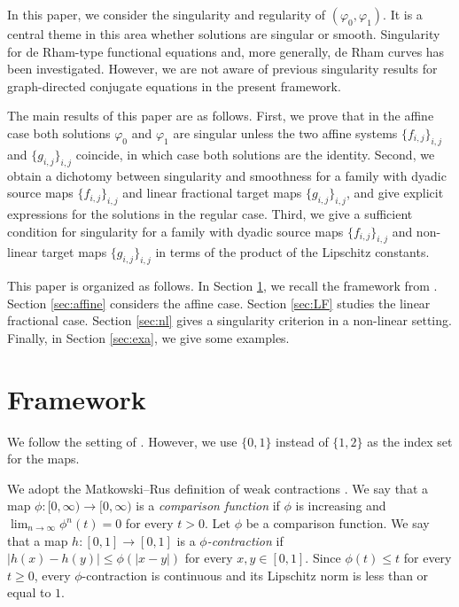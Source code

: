 \documentclass[a4paper, reqno, 11pt]{amsart}
\theoremstyle{definition}
\begin{document}
In this paper, we consider the singularity and regularity of  $(\varphi_0, \varphi_1)$. 
It is a central theme in this area whether solutions are singular or smooth. 
Singularity for de Rham-type functional equations and, more generally, de Rham curves has been investigated. 
However, we are not aware of previous singularity results for graph-directed conjugate equations in the present framework. 

The main results of this paper are as follows.
First, we prove that in the affine case both solutions $\varphi_0$ and $\varphi_1$ are singular unless the two affine systems $\{f_{i,j}\}_{i,j}$ and $\{g_{i,j}\}_{i,j}$ coincide, in which case both solutions are the identity. 
Second,  
we obtain a dichotomy between singularity and smoothness for a family with dyadic source maps $\{f_{i,j}\}_{i,j}$ and linear fractional target maps $\{g_{i,j}\}_{i,j}$, and give explicit expressions for the solutions in the regular case. 
Third, we give a sufficient condition for singularity for a family with dyadic source maps $\{f_{i,j}\}_{i,j}$ and non-linear target maps $\{g_{i,j}\}_{i,j}$ in terms of the product of the Lipschitz constants.


This paper is organized as follows. 
In Section  \ref{sec:frame}, we recall the framework from \cite[Section 5]{Okamura2025}. 
Section \ref{sec:affine} considers the affine case. 
Section \ref{sec:LF} studies the linear fractional case. 
Section  \ref{sec:nl} gives a singularity criterion in a non-linear setting.
Finally, in Section \ref{sec:exa}, we give some examples. 


\section{Framework}\label{sec:frame}

We follow the setting of \cite[Section 5]{Okamura2025}. 
However, we use $\{0,1\}$ instead of $\{1,2\}$ as the index set for the maps. 

We adopt the Matkowski--Rus definition of weak contractions \cite{Matkowski1975,Rus2001}.  
We say that a map $\phi : [0,\infty) \to [0,\infty)$ is a {\it comparison function} if 
$\phi$ is increasing and 
$\displaystyle \lim_{n \to \infty} \phi^n (t) = 0$ for every $t > 0$. 
Let $\phi$ be a comparison function. 
We say that a map $h : [0,1] \to [0,1]$ is a {\it $\phi$-contraction} if 
$|h(x) - h(y)| \le \phi(|x-y|)$ for every $x, y \in [0,1]$. 
Since $\phi(t) \le t$ for every $t \ge 0$, every $\phi$-contraction is continuous and its Lipschitz norm is less than or equal to $1$. 
\end{document}
